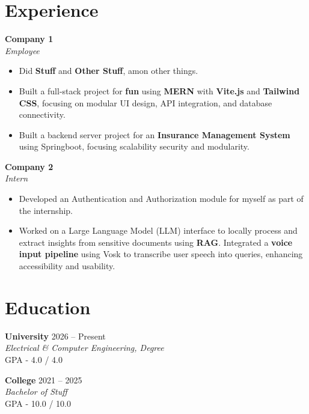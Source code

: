 \documentclass[a4paper,10pt]{article}
\begin{document}
	\section{Experience}
	
	\textbf{Company 1} \\
	\textit{Employee}
	\begin{itemize}
		\item Did \textbf{Stuff} and \textbf{Other Stuff}, amon other things.
		\item Built a full-stack project for \textbf{fun} using \textbf{MERN} with \textbf{Vite.js} and \textbf{Tailwind CSS}, focusing on modular UI design, API integration, and database connectivity.
		\item Built a backend server project for an \textbf{Insurance Management System} using Springboot, focusing scalability security and modularity.
	\end{itemize}
	
	\textbf{Company 2} \\
	\textit{Intern}
	\begin{itemize}
		\item Developed an Authentication and Authorization module for myself as part of the internship.
		\item Worked on a Large Language Model (LLM) interface to locally process and extract insights from sensitive documents using \textbf{RAG}. Integrated a \textbf{voice input pipeline} using Vosk to transcribe user speech into queries, enhancing accessibility and usability.
	\end{itemize}
	
	\section{Education}
	
	\textbf{University} \hfill 2026 -- Present \\
	\textit{Electrical \& Computer Engineering, Degree} \\
	GPA - 4.0 / 4.0
	
	\vspace{4pt}
	
	\textbf{College} \hfill 2021 -- 2025 \\
	\textit{Bachelor of Stuff} \\
	GPA - 10.0 / 10.0
	
\end{document}
